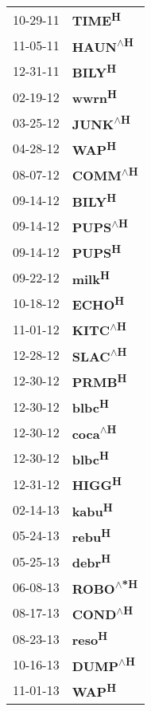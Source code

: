 \begin{supertabular}{p{0.08\textwidth}p{0.2\textwidth}}
 10-29-11 &           \textbf{TIME\textsuperscript{H}} \\
 11-05-11 &   \textbf{HAUN\textsuperscript{$\wedge$H}} \\
 12-31-11 &           \textbf{BILY\textsuperscript{H}} \\
 02-19-12 &           \textbf{wwrn\textsuperscript{H}} \\
 03-25-12 &   \textbf{JUNK\textsuperscript{$\wedge$H}} \\
 04-28-12 &            \textbf{WAP\textsuperscript{H}} \\
 08-07-12 &   \textbf{COMM\textsuperscript{$\wedge$H}} \\
 09-14-12 &           \textbf{BILY\textsuperscript{H}} \\
 09-14-12 &   \textbf{PUPS\textsuperscript{$\wedge$H}} \\
 09-14-12 &           \textbf{PUPS\textsuperscript{H}} \\
 09-22-12 &           \textbf{milk\textsuperscript{H}} \\
 10-18-12 &           \textbf{ECHO\textsuperscript{H}} \\
 11-01-12 &   \textbf{KITC\textsuperscript{$\wedge$H}} \\
 12-28-12 &   \textbf{SLAC\textsuperscript{$\wedge$H}} \\
 12-30-12 &           \textbf{PRMB\textsuperscript{H}} \\
 12-30-12 &           \textbf{blbc\textsuperscript{H}} \\
 12-30-12 &   \textbf{coca\textsuperscript{$\wedge$H}} \\
 12-30-12 &           \textbf{blbc\textsuperscript{H}} \\
 12-31-12 &           \textbf{HIGG\textsuperscript{H}} \\
 02-14-13 &           \textbf{kabu\textsuperscript{H}} \\
 05-24-13 &           \textbf{rebu\textsuperscript{H}} \\
 05-25-13 &           \textbf{debr\textsuperscript{H}} \\
 06-08-13 &  \textbf{ROBO\textsuperscript{$\wedge$*H}} \\
 08-17-13 &   \textbf{COND\textsuperscript{$\wedge$H}} \\
 08-23-13 &           \textbf{reso\textsuperscript{H}} \\
 10-16-13 &   \textbf{DUMP\textsuperscript{$\wedge$H}} \\
 11-01-13 &            \textbf{WAP\textsuperscript{H}} \\

\end{supertabular}
